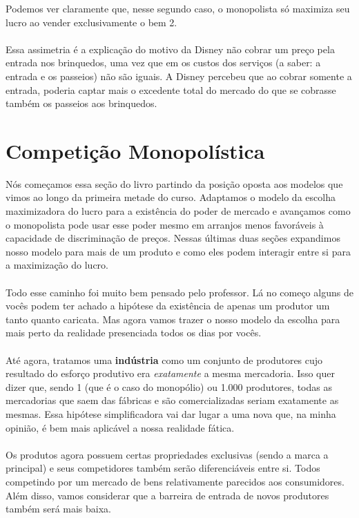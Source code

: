 \documentclass[a4paper,11pt,oneside]{book}
\theoremstyle{definition}
\theoremstyle{break}
\begin{document}
Podemos ver claramente que, nesse segundo caso, o monopolista só maximiza seu lucro ao vender exclusivamente o bem 2.
\\
\\
Essa assimetria é a explicação do motivo da Disney não cobrar um preço pela entrada nos brinquedos, uma vez que em os custos dos serviços (a saber: a entrada e os passeios) não são iguais. A Disney percebeu que ao cobrar somente a entrada, poderia captar mais o excedente total do mercado do que se cobrasse também os passeios aos brinquedos.

\section{Competição Monopolística}

Nós começamos essa seção do livro partindo da posição oposta aos modelos que vimos ao longo da primeira metade do curso. Adaptamos o modelo da escolha maximizadora do lucro para a existência do poder de mercado e avançamos como o monopolista pode usar esse poder mesmo em arranjos menos favoráveis à capacidade de discriminação de preços. Nessas últimas duas seções expandimos nosso modelo para mais de um produto e como eles podem interagir entre si para a maximização do lucro.
\\
\\
Todo esse caminho foi muito bem pensado pelo professor. Lá no começo alguns de vocês podem ter achado a hipótese da existência de apenas um produtor um tanto quanto caricata. Mas agora vamos trazer o nosso modelo da escolha para mais perto da realidade presenciada todos os dias por vocês.
\\
\\
Até agora, tratamos uma \textbf{indústria} como um conjunto de produtores cujo resultado do esforço produtivo era \textit{exatamente} a mesma mercadoria. Isso quer dizer que, sendo 1 (que é o caso do monopólio) ou 1.000 produtores, todas as mercadorias que saem das fábricas e são comercializadas seriam exatamente as mesmas. Essa hipótese simplificadora vai dar lugar a uma nova que, na minha opinião, é bem mais aplicável a nossa realidade fática.
\\
\\
Os produtos agora possuem certas propriedades exclusivas (sendo a marca a principal) e seus competidores também serão diferenciáveis entre si. Todos competindo por um mercado de bens relativamente parecidos aos consumidores. Além disso, vamos considerar que a barreira de entrada de novos produtores também será mais baixa.
\end{document}
